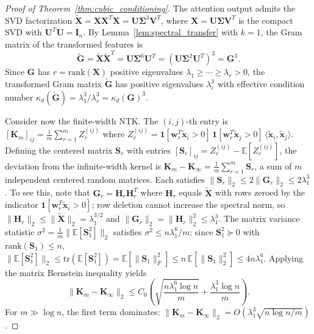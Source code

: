 \documentclass{article}
\theoremstyle{plain}
\theoremstyle{definition}
\theoremstyle{remark}
\newcommand{\E}{\mathbb{E}}
\begin{document}
\begin{proof}[Proof of Theorem~\ref{thm:cubic_conditioning}]
The attention output admits the SVD factorization $\tilde{\mathbf{X}} = \mathbf{X}\mathbf{X}^T\mathbf{X} = \mathbf{U}\boldsymbol{\Sigma}^3\mathbf{V}^T$, where $\mathbf{X} = \mathbf{U}\boldsymbol{\Sigma}\mathbf{V}^T$ is the compact SVD with $\mathbf{U}^T\mathbf{U} = \mathbf{I}_n$. By Lemma~\ref{lem:spectral_transfer} with $k = 1$, the Gram matrix of the transformed features is
$$\tilde{\mathbf{G}} = \tilde{\mathbf{X}}\tilde{\mathbf{X}}^T = \mathbf{U}\boldsymbol{\Sigma}^6\mathbf{U}^T = (\mathbf{U}\boldsymbol{\Sigma}^2\mathbf{U}^T)^3 = \mathbf{G}^3.$$
Since $\mathbf{G}$ has $r = \mathrm{rank}(\mathbf{X})$ positive eigenvalues $\lambda_1 \geq \cdots \geq \lambda_r > 0$, the transformed Gram matrix $\tilde{\mathbf{G}}$ has positive eigenvalues $\lambda_i^3$ with effective condition number $\kappa_d(\tilde{\mathbf{G}}) = \lambda_1^3/\lambda_r^3 = \kappa_d(\mathbf{G})^3$.

Consider now the finite-width NTK. The $(i,j)$-th entry is $[\mathbf{K}_m]_{ij} = \frac{1}{m}\sum_{r=1}^m Z_r^{(ij)}$ where $Z_r^{(ij)} = \mathbf{1}[\mathbf{w}_r^T\tilde{\mathbf{x}}_i > 0]\,\mathbf{1}[\mathbf{w}_r^T\tilde{\mathbf{x}}_j > 0]\,\langle\tilde{\mathbf{x}}_i,\tilde{\mathbf{x}}_j\rangle$. Defining the centered matrix $\mathbf{S}_r$ with entries $[\mathbf{S}_r]_{ij} = Z_r^{(ij)} - \E[Z_r^{(ij)}]$, the deviation from the infinite-width kernel is $\mathbf{K}_m - \mathbf{K}_\infty = \frac{1}{m}\sum_{r=1}^m \mathbf{S}_r$, a sum of $m$ independent centered random matrices. Each satisfies $\|\mathbf{S}_r\|_2 \leq 2\|\mathbf{G}_r\|_2 \leq 2\lambda_1^3$. To see this, note that $\mathbf{G}_r = \mathbf{H}_r\mathbf{H}_r^T$ where $\mathbf{H}_r$ equals $\tilde{\mathbf{X}}$ with rows zeroed by the indicator $\mathbf{1}[\mathbf{w}_r^T\tilde{\mathbf{x}}_i>0]$; row deletion cannot increase the spectral norm, so $\|\mathbf{H}_r\|_2 \leq \|\tilde{\mathbf{X}}\|_2 = \lambda_1^{3/2}$ and $\|\mathbf{G}_r\|_2 = \|\mathbf{H}_r\|_2^2 \leq \lambda_1^3$. The matrix variance statistic $\sigma^2 = \frac{1}{m}\|\E[\mathbf{S}_1^2]\|_2$ satisfies $\sigma^2 \leq n\lambda_1^6/m$: since $\mathbf{S}_1^2 \succeq 0$ with $\mathrm{rank}(\mathbf{S}_1) \leq n$, $\|\E[\mathbf{S}_1^2]\|_2 \leq \mathrm{tr}(\E[\mathbf{S}_1^2]) = \E[\|\mathbf{S}_1\|_F^2] \leq n\,\E[\|\mathbf{S}_1\|_2^2] \leq 4n\lambda_1^6$. Applying the matrix Bernstein inequality \citep{tropp2012user} yields
\begin{equation}
\|\mathbf{K}_m - \mathbf{K}_\infty\|_2 \leq C_0\left(\sqrt{\frac{n\lambda_1^6 \log n}{m}} + \frac{\lambda_1^3 \log n}{m}\right).
\end{equation}
For $m \gg \log n$, the first term dominates: $\|\mathbf{K}_m - \mathbf{K}_\infty\|_2 = O(\lambda_1^3\sqrt{n\log n/m})$.


\end{proof}
\end{document}
